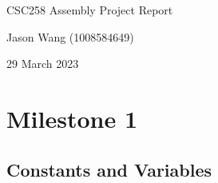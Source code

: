 \documentclass{article}
\begin{document}
\begin{center}
        \huge
        CSC258 Assembly Project Report        \vspace{1cm}
        
        
        \large
        Jason Wang (1008584649)
        
        29 March 2023

       

 \end{center}
 
 \tableofcontents
 
 
 
\vspace{10mm}

\section*{Milestone 1}


\subsection*{Constants and Variables}
\end{document}

